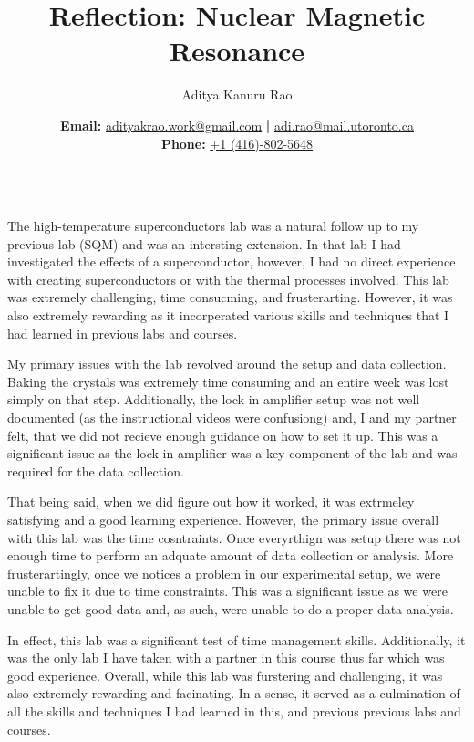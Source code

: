 \documentclass[11pt,a4paper]{article}
\newcommand\psetnum{Reflection: Nuclear Magnetic Resonance}
\newcommand\yourname{Aditya Kanuru Rao}
\begin{document}
	\title{\vspace{-4cm}\psetnum}
        \author{\yourname}
	\date{\vspace{-0.3em}\textbf{Email:} \href{mailto:adityakrao.work@gmail.com}{adityakrao.work@gmail.com} \textbf{|} \href{mailto:adi.rao@mail.utoronto.ca}{adi.rao@mail.utoronto.ca}\\\textbf{Phone:} \href{tel:14168025648}{+1 (416)-802-5648}}
        \vspace{0cm}
	\maketitle
\vspace{-1.2cm}
\rule{\linewidth}{0.5pt}

\textbf{}

The high-temperature superconductors lab was a natural follow up to my previous lab (SQM) and was an intersting extension. In that lab I had investigated the effects of a superconductor, however, I had no direct experience with creating superconductors or with the thermal processes involved. This lab was extremely  challenging, time consucming, and frusterarting. However, it was also extremely rewarding as it incorperated various skills and techniques that I had learned in previous labs and courses.

My primary issues with the lab revolved around the setup and data collection. Baking the crystals was extremely time consuming and an entire week was lost simply on that step. Additionally, the lock in amplifier setup was not well documented (as the instructional videos were confusiong) and, I and my partner felt, that we did not recieve enough guidance on how to set it up. This was a significant issue as the lock in amplifier was a key component of the lab and was required for the data collection.

That being said, when we did figure out how it worked, it was extrmeley satisfying and a good learning experience. However, the primary issue overall with this lab was the time cosntraints. Once everyrthign was setup there was not enough time to perform an adquate amount of data collection or analysis. More frusterartingly, once we notices a problem in our experimental setup, we were unable to fix it due to time constraints. This was a significant issue as we were unable to get good data and, as such, were unable to do a proper data analysis.

In effect, this lab was a significant test of time management skills. Additionally, it was the only lab I have taken with a partner in this course thus far which was good experience. Overall, while this lab was furstering and challenging, it was also extremely rewarding and facinating. In a sense, it served as a culmination of all the skills and techniques I had learned in this, and previous previous labs and courses.
\end{document}
